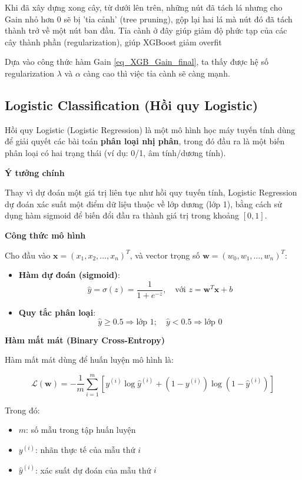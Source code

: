     Khi đã xây dựng xong cây, từ dưới lên trên, những nút đã tách lá nhưng cho Gain nhỏ hơn 0 sẽ bị 'tỉa cảnh' (tree pruning), gộp lại hai lá mà nút đó đã tách thành trở về một nút ban đầu. Tỉa cành ở đây giúp giảm độ phức tạp của các cây thành phần (regularization), giúp XGBoost giảm overfit
    
    Dựa vào công thức hàm Gain \eqref{eq_XGB_Gain_final}, ta thấy được hệ số regularization $\lambda$ và $\alpha$ càng cao thì việc tỉa cành sẽ càng mạnh.
    
\subsection {Logistic Classification (Hồi quy Logistic)}
\label{label:log_class}

Hồi quy Logistic (Logistic Regression) là một mô hình học máy tuyến tính dùng để giải quyết các bài toán \textbf{phân loại nhị phân}, trong đó đầu ra là một biến phân loại có hai trạng thái (ví dụ: 0/1, âm tính/dương tính).

\textbf{Ý tưởng chính}

Thay vì dự đoán một giá trị liên tục như hồi quy tuyến tính, Logistic Regression dự đoán xác suất một điểm dữ liệu thuộc về lớp dương (lớp 1), bằng cách sử dụng hàm sigmoid để biến đổi đầu ra thành giá trị trong khoảng \([0, 1]\).

\textbf{Công thức mô hình}

Cho đầu vào \( \mathbf{x} = (x_1, x_2, \ldots, x_n)^T \), và vector trọng số \( \mathbf{w} = (w_0, w_1, \ldots, w_n)^T \):

\begin{itemize}
    \item \textbf{Hàm dự đoán (sigmoid)}:
    \[
    \hat{y} = \sigma(z) = \frac{1}{1 + e^{-z}}, \quad \text{với } z = \mathbf{w}^T \mathbf{x} + b
    \]
    \item \textbf{Quy tắc phân loại}:
    \[
    \hat{y} \geq 0.5 \Rightarrow \text{lớp 1}; \quad \hat{y} < 0.5 \Rightarrow \text{lớp 0}
    \]
\end{itemize}

\textbf{Hàm mất mát (Binary Cross-Entropy)}

Hàm mất mát dùng để huấn luyện mô hình là:

\[
\mathcal{L}(\mathbf{w}) = -\frac{1}{m} \sum_{i=1}^{m} \left[ y^{(i)} \log \hat{y}^{(i)} + (1 - y^{(i)}) \log (1 - \hat{y}^{(i)}) \right]
\]

Trong đó:
\begin{itemize}
    \item \( m \): số mẫu trong tập huấn luyện
    \item \( y^{(i)} \): nhãn thực tế của mẫu thứ \( i \)
    \item \( \hat{y}^{(i)} \): xác suất dự đoán của mẫu thứ \( i \)
\end{itemize}

